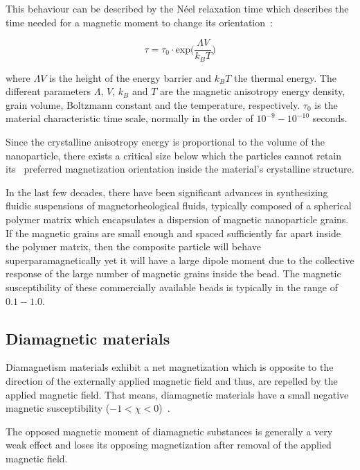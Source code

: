 This behaviour can be described by the N\'{e}el relaxation time which describes the time needed for a magnetic moment to change its orientation~\cite{Neel1949}:

\begin{equation}
	\tau = \tau_{0}\cdot \text{exp}\big(\frac{\Lambda V}{k_{B}T}\big)
	\label{eqn:neelRelaxationTime}
\end{equation}

where $\Lambda V$ is the height of the energy barrier and $k_{B}T$ the thermal energy. The different parameters $\Lambda$, $V$, $k_{B}$ and $T$ are the magnetic anisotropy energy density, grain volume, Boltzmann constant and the temperature, respectively. $\tau_{0}$ is the material characteristic time scale, normally in the order of $10^{-9}-10^{-10}$ seconds.

Since the crystalline anisotropy energy is proportional to the volume of the nanoparticle, there exists a critical size below which the particles cannot retain its~\cite{14} preferred magnetization orientation inside the material's crystalline structure. 

In the last few decades, there have been significant advances in synthesizing fluidic suspensions of magnetorheological fluids, typically composed of a spherical polymer matrix which encapsulates a dispersion of magnetic nanoparticle grains. If the magnetic grains are small enough and spaced sufficiently far apart inside the polymer matrix, then the composite particle will behave superparamagnetically yet it will have a large dipole moment due to the collective response of the large number of magnetic grains inside the bead. The magnetic susceptibility of these commercially available beads is typically in the range of $0.1-1.0$. 


\subsection{Diamagnetic materials}\label{subsec:dieamagneticMaterials}
Diamagnetism materials exhibit a net magnetization which is opposite to the direction of the externally applied magnetic field and thus, are repelled by the applied magnetic field. That means, diamagnetic materials have a small negative magnetic susceptibility ($-1<\chi<0$)~\cite{Cullity2011,Jiles1998}. 

The opposed magnetic moment of diamagnetic substances is generally a very weak effect and loses its opposing magnetization after removal of the applied magnetic field. 

